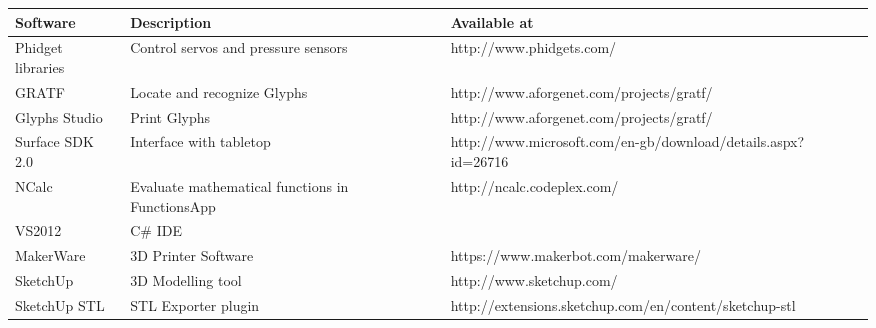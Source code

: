 \documentclass[a4paper]{article}
\begin{document}
\begin{center}
    \begin{tabular}{ | l | p{3cm} | p{8cm} |}
    \hline
    Software & Description & Available at \\ \hline
    Phidget libraries & Control servos and pressure sensors & http://www.phidgets.com/ \\ \hline
    GRATF & Locate and recognize Glyphs & http://www.aforgenet.com/projects/gratf/ \\ \hline
    Glyphs Studio & Print Glyphs & http://www.aforgenet.com/projects/gratf/ \\ \hline
    Surface SDK 2.0 & Interface with tabletop & http://www.microsoft.com/en-gb/download/details.aspx?id=26716 \\ \hline
    NCalc & Evaluate mathematical functions in FunctionsApp & http://ncalc.codeplex.com/ \\ \hline
    VS2012 & C\# IDE & \- \\ \hline
    MakerWare & 3D Printer Software & https://www.makerbot.com/makerware/ \\ \hline
    SketchUp & 3D Modelling tool & http://www.sketchup.com/ \\ \hline
    SketchUp STL & STL Exporter plugin & http://extensions.sketchup.com/en/content/sketchup-stl \\ \hline
    \end{tabular}
\end{center}
\end{document}
